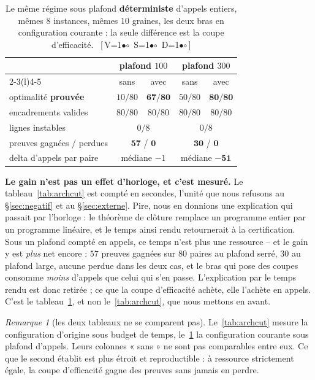 \documentclass[11pt,a4paper]{article}
\theoremstyle{plain}
\theoremstyle{remark}
\newtheorem{remark}{Remarque}
\newcommand{\cfgm}[1]{\ifnum#1=1$\bullet$\else$\circ$\fi}
\newcommand{\conf}[3]{%
  \textsf{\footnotesize[\,V\cfgm{#1}\ S\cfgm{#2}\ D\cfgm{#3}\,]}}
\begin{document}
\begin{table}[H]
\centering
\caption{Le même régime sous plafond \textbf{déterministe} d'appels entiers,
mêmes 8 instances, mêmes 10 graines, les deux bras en configuration
courante : la seule différence est la coupe d'efficacité.\ \conf{1}{1}{1}}
\label{tab:cibledeterm}
\setlength{\tabcolsep}{5pt}
\begin{tabular}{lcccc}
\toprule
& \multicolumn{2}{c}{plafond $100$} & \multicolumn{2}{c}{plafond $300$}\\
\cmidrule(lr){2-3}\cmidrule(l){4-5}
& sans & avec & sans & avec\\
\midrule
optimalité \textbf{prouvée} & $10/80$ & $\mathbf{67/80}$
                            & $50/80$ & $\mathbf{80/80}$\\
encadrements valides & $80/80$ & $80/80$ & $80/80$ & $80/80$\\
lignes instables & \multicolumn{2}{c}{$0/8$} & \multicolumn{2}{c}{$0/8$}\\
\midrule
preuves gagnées / perdues & \multicolumn{2}{c}{$\mathbf{57}$ / $\mathbf{0}$}
                          & \multicolumn{2}{c}{$\mathbf{30}$ / $\mathbf{0}$}\\
delta d'appels par paire & \multicolumn{2}{c}{médiane $-1$}
                         & \multicolumn{2}{c}{médiane $\mathbf{-51}$}\\
\bottomrule
\end{tabular}
\end{table}

\noindent
\textbf{Le gain n'est pas un effet d'horloge, et c'est mesuré.} Le
tableau~\ref{tab:archcut} est compté en secondes, l'unité que nous refusons
au §\ref{sec:negatif} et au §\ref{sec:externe}. Pire, nous en donnions
une explication qui passait par l'horloge : le théorème de clôture remplace
un programme entier par un programme linéaire, et le temps ainsi rendu
retournerait à la certification. Sous un plafond compté en appels, ce temps
n'est plus une ressource -- et le gain y est \emph{plus} net encore :
$57$ preuves gagnées sur $80$ paires au plafond serré, $30$ au plafond
large, aucune perdue dans les deux cas, et le bras qui pose des coupes
consomme \emph{moins} d'appels que celui qui s'en passe. L'explication par
le temps rendu est donc retirée ; ce que la coupe d'efficacité achète, elle
l'achète en appels. C'est le tableau~\ref{tab:cibledeterm}, et non
le~\ref{tab:archcut}, que nous mettons en avant.

\begin{remark}[les deux tableaux ne se comparent pas]
Le~\ref{tab:archcut} mesure la configuration d'origine sous budget de temps,
le~\ref{tab:cibledeterm} la configuration courante sous plafond d'appels.
Leurs colonnes « sans » ne sont pas comparables entre eux. Ce que le second
établit est plus étroit et reproductible : à ressource strictement égale, la
coupe d'efficacité gagne des preuves sans jamais en perdre.
\end{remark}
\end{document}
